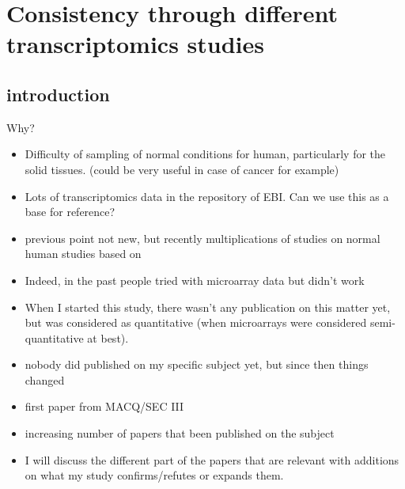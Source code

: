 \chapter{Consistency through different transcriptomics studies}
\label{ch:Transcriptomics}
\begin{comment}
As previously stated in the introduction, while I started this project,
there wasn't any study that was investigating in-depth the reproducibility of
transcriptomics.

However, in August 2014 a paper comparing different preparation methods,
sequencing technologies operated in different laboratories
on samples from the same biological source concludes that while absolute
measurements are not consistent, the relative expression is highly consistent
(95\% Pearson correlation?)


Example:~\cite{schwanhausserglobal:2011}
\end{comment}

\section{introduction}

Why?

\begin{itemize}
    \item Difficulty of sampling of normal conditions for human, particularly
        for the solid tissues. (could be very useful in case of cancer for
        example)
    \item Lots of transcriptomics data in the repository of EBI. Can we use
        this as a base for reference?
    \item previous point not new, but recently multiplications of studies on
        normal human studies based on \Rnaseq
    \item Indeed, in the past people tried with microarray data but didn't work
    \item When I started this study, there wasn't any publication on this matter
        yet, but \Rnaseq was considered as quantitative (when microarrays were
        considered semi-quantitative at best).
    \item nobody did published on my specific subject yet, but since then things changed
    \item first paper from MACQ/SEC III
    \item increasing number of papers that been published on the subject
    \item I will discuss the different part of the papers that are relevant
        with additions on what my study confirms/refutes or expands them.
\end{itemize}

